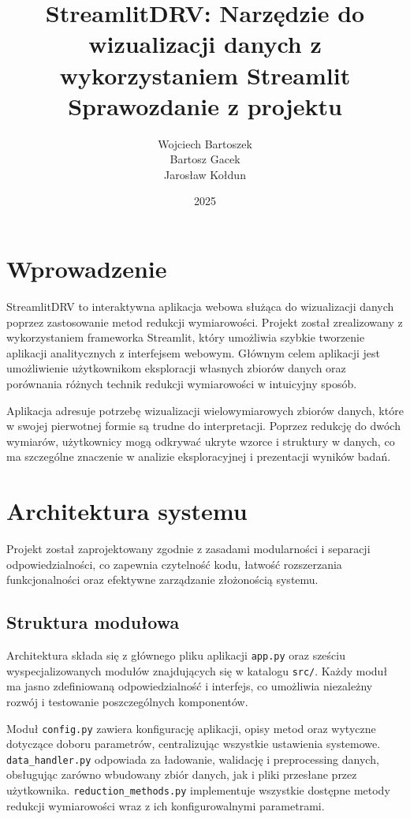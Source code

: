 \documentclass[a4paper, 12pt]{article}
\title{StreamlitDRV: Narzędzie do wizualizacji danych z wykorzystaniem Streamlit\\ \vspace{1.5em}
Sprawozdanie z projektu}
\author{Wojciech Bartoszek \\ Bartosz Gacek \\ Jarosław Kołdun}
\date{2025}
\begin{document}
\maketitle

\section{Wprowadzenie}

StreamlitDRV to interaktywna aplikacja webowa służąca do wizualizacji danych poprzez zastosowanie metod redukcji wymiarowości. Projekt został zrealizowany z wykorzystaniem frameworka Streamlit, który umożliwia szybkie tworzenie aplikacji analitycznych z interfejsem webowym. Głównym celem aplikacji jest umożliwienie użytkownikom eksploracji własnych zbiorów danych oraz porównania różnych technik redukcji wymiarowości w intuicyjny sposób.

Aplikacja adresuje potrzebę wizualizacji wielowymiarowych zbiorów danych, które w swojej pierwotnej formie są trudne do interpretacji. Poprzez redukcję do dwóch wymiarów, użytkownicy mogą odkrywać ukryte wzorce i struktury w danych, co ma szczególne znaczenie w analizie eksploracyjnej i prezentacji wyników badań.

\section{Architektura systemu}

Projekt został zaprojektowany zgodnie z zasadami modularności i separacji odpowiedzialności, co zapewnia czytelność kodu, łatwość rozszerzania funkcjonalności oraz efektywne zarządzanie złożonością systemu.

\subsection{Struktura modułowa}

Architektura składa się z głównego pliku aplikacji \texttt{app.py} oraz sześciu wyspecjalizowanych modułów znajdujących się w katalogu \texttt{src/}. Każdy moduł ma jasno zdefiniowaną odpowiedzialność i interfejs, co umożliwia niezależny rozwój i testowanie poszczególnych komponentów.

Moduł \texttt{config.py} zawiera konfigurację aplikacji, opisy metod oraz wytyczne dotyczące doboru parametrów, centralizując wszystkie ustawienia systemowe. \texttt{data\_handler.py} odpowiada za ładowanie, walidację i preprocessing danych, obsługując zarówno wbudowany zbiór danych, jak i pliki przesłane przez użytkownika. \texttt{reduction\_methods.py} implementuje wszystkie dostępne metody redukcji wymiarowości wraz z ich konfigurowalnymi parametrami.
\end{document}
